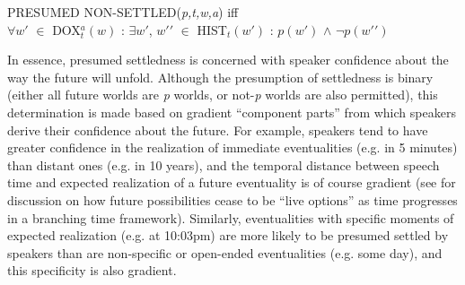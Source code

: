 \documentclass[output=paper,colorlinks,citecolor=brown]{langscibook}
\begin{document}
\begin{exe}
\ex\label{ex:hoff:presumednonsettledformal} PRESUMED NON-SETTLED(\textit{p,t,w,a}) iff \\
$\forall w \prime$ $\in$ \textsc{DOX}$_{t}^{a}(w)$ : $\exists w \prime$, $w\prime\prime$ $\in$ \textsc{HIST}$_{t}(w\prime)$ : $p(w\prime)$ $\wedge$ $\neg p(w\prime\prime)$
\end{exe}
	
In essence, presumed settledness is concerned with speaker confidence about the way the future will unfold. Although the presumption of settledness is binary (either all future worlds are \textit{p} worlds, or not-\textit{p} worlds are also permitted), this determination is made based on gradient ``component parts” from which speakers derive their confidence about the future. For example, speakers tend to have greater confidence in the realization of immediate eventualities (e.g. in 5 minutes) than distant ones (e.g. in 10 years), and the temporal distance between speech time and expected realization of a future eventuality is of course gradient (see \citet{Condoravdi2002} for discussion on how future possibilities cease to be ``live options'' as time progresses in a branching time framework). Similarly, eventualities with specific moments of expected realization (e.g. at 10:03pm) are more likely to be presumed settled by speakers than are non-specific or open-ended eventualities (e.g. some day), and this specificity is also gradient.
\end{document}
